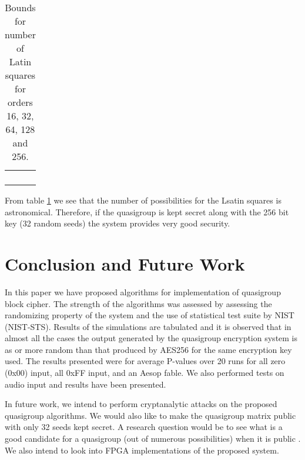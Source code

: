 \documentclass[conference]{IEEEtran}
\begin{document}
\begin{table}
\centering
\begin{tabular}{|l|}
\hline
\\\hline
\\\hline
\\\hline
\\\hline
\\\hline
\end{tabular}
\caption{Bounds for number of Latin squares for orders 16, 32, 64, 128 and 256.}
\label{numberOfLatinSquares}
\end{table}

From table \ref{numberOfLatinSquares} we see that the number of possibilities for the Lsatin squares is astronomical. Therefore, if the quasigroup is kept secret along with the 256 bit key (32 random seeds) the system provides very good security.

\section{Conclusion and Future Work}
In this paper we have proposed algorithms for implementation of quasigroup block cipher. The strength of the algorithms was assessed by assessing the randomizing property of the system and the use of statistical test suite by NIST (NIST-STS). Results of the simulations are tabulated and it is observed that in almost all the cases the output generated by the quasigroup encryption system is as or more random than that produced by AES256 for the same encryption key used. The results presented were for average P-values over 20 runs for all zero (0x00) input, all 0xFF input, and an Aesop fable. We also performed tests on audio input and results have been presented.

In future work, we intend to perform cryptanalytic attacks on the proposed quasigroup algorithms. We would also like to make the quasigroup matrix public with only 32 seeds kept secret. A research question would be to see what is a good candidate for a quasigroup (out of numerous possibilities) when it is public \cite{Dvorsky}. We also intend to look into FPGA implementations of the proposed system.




\end{document}
